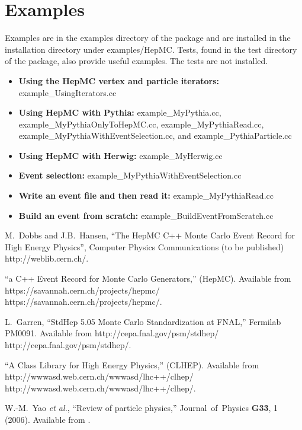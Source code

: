 \documentclass[11pt,letterpaper]{article}
\begin{document}
\section{Examples}
\label{examples}
Examples are in the examples directory of the package 
and are installed in the installation directory under examples/HepMC.
Tests, found in the test directory of the package, also provide useful examples.
The tests are not installed.

\begin{itemize}\setlength{\itemsep}{0pt}
  \item{\bf Using the HepMC vertex and particle iterators:}
       {example\_UsingIterators.cc} 
  \item{\bf Using HepMC with Pythia:}
      {example\_MyPythia.cc,
      example\_MyPythiaOnlyToHepMC.cc,
      example\_MyPythiaRead.cc,
      example\_MyPythiaWithEventSelection.cc, and
      example\_PythiaParticle.cc
      }
  \item{\bf Using HepMC with Herwig:}
     {example\_MyHerwig.cc}
  \item{\bf Event selection:}
     {example\_MyPythiaWithEventSelection.cc}
  \item{\bf Write an event file and then read it:}
     {example\_MyPythiaRead.cc}
  \item{\bf Build an event from scratch:}
     {example\_BuildEventFromScratch.cc}
\end{itemize}


%
%
\begin{thebibliography}{99}

  M.~Dobbs and J.B.~Hansen, ``The HepMC C++ Monte Carlo Event Record for
  High Energy Physics'', Computer Physics Communications (to be
  published) 
  {http://weblib.cern.ch/}.  

  ``a C++ Event Record for Monte Carlo Generators,'' (HepMC).
  Available from 
  \htmladdnormallink
  {https://savannah.cern.ch/projects/hepmc/}
  {https://savannah.cern.ch/projects/hepmc/}.

  L.~Garren, ``StdHep 5.05 Monte Carlo Standardization at FNAL,''
  Fermilab PM0091. Available from 
  \htmladdnormallink
  {http://cepa.fnal.gov/psm/stdhep/}
  {http://cepa.fnal.gov/psm/stdhep/}.

  ``A Class Library for High Energy Physics,'' (CLHEP).
  Available from 
  \htmladdnormallink
  {http://wwwasd.web.cern.ch/wwwasd/lhc++/clhep/}
  {http://wwwasd.web.cern.ch/wwwasd/lhc++/clhep/}.

  W.-M.~Yao {\it et al.}, ``Review of particle physics,''
  Journal\ of\ Physics {\bf G33}, 1 (2006).
  Available from .

\end{thebibliography}

%
%
\end{document}
